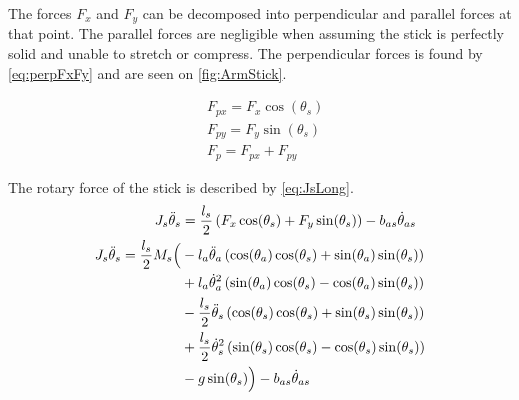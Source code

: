 The forces $F_x$ and $F_y$ can be decomposed into perpendicular and parallel forces at that point. The parallel forces are negligible when assuming the stick is perfectly solid and unable to stretch or compress. The perpendicular forces is found by \autoref{eq:perpFxFy} and are seen on \autoref{fig:ArmStick}.


\begin{subequations}\label{eq:perpFxFy}
\begin{flalign}
& F_{px}=F_x\cos(\theta_s) \\
& F_{py}=F_y\sin(\theta_s)  \\
& F_p = F_{px}+F_{py} 
\end{flalign}
\end{subequations}

The rotary force of the stick is described by \autoref{eq:JsLong}.
\begin{subequations}
\begin{flalign}
 J_s\ddot{\theta}_s &=\frac{l_s}{2}\left(F_x\cos(\theta_s)+F_y\sin(\theta_s)\right)-b_{as}\dot{\theta}_{as}  \\
 J_s\ddot{\theta}_s = \frac{l_s}{2}M_s \Big( &-l_a\ddot{\theta}_a\left(\cos(\theta_a)\cos(\theta_s)+\sin(\theta_a)\sin(\theta_s)\right) \notag \\
& +l_a\dot{\theta}_a^2\left(\sin(\theta_a)\cos(\theta_s)-\cos(\theta_a)\sin(\theta_s)\right) \notag \\
& -\frac{l_s}{2}\ddot{\theta}_s\left(\cos(\theta_s)\cos(\theta_s)+\sin(\theta_s)\sin(\theta_s)\right) \notag \\
& +\frac{l_s}{2}\dot{\theta}_s^2\left(\sin(\theta_s)\cos(\theta_s)-\cos(\theta_s)\sin(\theta_s)\right)  \notag \\
& -g\sin(\theta_s) \Big)-b_{as}\dot{\theta}_{as} \label{eq:JsLong}
\end{flalign}
\end{subequations}

